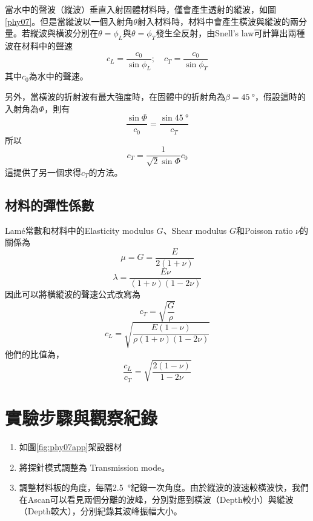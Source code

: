 \documentclass[12pt]{report}
\begin{document}
當水中的聲波（縱波）垂直入射固體材料時，僅會產生透射的縱波，如圖\ref{phy07}。但是當縱波以一個入射角$\theta$射入材料時，材料中會產生橫波與縱波的兩分量。若縱波與橫波分別在$\theta=\phi_L$與$\theta=\phi_T$發生全反射，由Snell's law可計算出兩種波在材料中的聲速
\begin{equation}
    c_L = \frac{c_0}{\sin\phi_L};\quad c_T = \frac{c_0}{\sin\phi_T}
\end{equation}
其中$c_0$為水中的聲速。

另外，當橫波的折射波有最大強度時，在固體中的折射角為$\beta=\SI{45}{\degree}$，假設這時的入射角為$\Phi$，則有
\begin{equation}
    \frac{\sin{\Phi}}{c_0} = \frac{\sin{\SI{45}{\degree}}}{c_T}
\end{equation}
所以
\begin{equation}
    c_T = \frac{1}{\sqrt{2}\sin\Phi}c_0
\end{equation}
這提供了另一個求得$c_T$的方法。

\subsection{材料的彈性係數}
Lamé常數和材料中的Elasticity modulus $G$、Shear modulus $G$和Poisson ratio $\nu$的關係為
\begin{equation}
    \mu=G=\frac{E}{2(1+\nu)}
\end{equation}
\begin{equation}
    \lambda = \frac{E\nu}{(1+\nu)(1-2\nu)}
\end{equation}
因此可以將橫縱波的聲速公式改寫為
\begin{equation}\label{speed1}
    c_T = \sqrt{\frac{G}{\rho}}
\end{equation}
\begin{equation}\label{speed2}
    c_L = \sqrt{\frac{E(1-\nu)}{\rho(1+\nu)(1-2\nu)}}
\end{equation}
他們的比值為，
\begin{equation}\label{speed_ratio}
    \frac{c_L}{c_T}=\sqrt{\frac{2(1-\nu)}{1-2\nu}}
\end{equation}


\section{實驗步驟與觀察紀錄}

\begin{enumerate}
    \item 如圖\ref{fig:phy07app}架設器材
    \item 將探針模式調整為 Transmission mode。
    \item 調整材料板的角度，每隔\SI{2.5}{\degree}紀錄一次角度。由於縱波的波速較橫波快，我們在Ascan可以看見兩個分離的波峰，分別對應到橫波（Depth較小）與縱波（Depth較大），分別紀錄其波峰振幅大小。
\end{enumerate}
\end{document}

